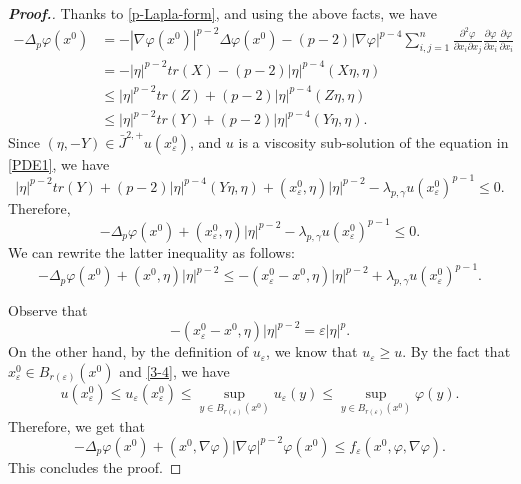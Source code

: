 \documentclass[12pt]{amsart}
\newcommand{\1}{\mathbf 1}
\begin{document}
\begin{proof}[\bf Proof.]
Thanks to \eqref{p-Lapla-form}, and using the above facts, we have
\begin{align*}
-\Delta_p \varphi (x^0) &=-|\nabla \varphi(x^0)|^{p-2} \Delta \varphi(x^0)-(p-2)|\nabla \varphi|^{p-4}\sum_{i,j=1}^n  \frac{\partial^2 \varphi}{\partial x_i \partial x_j}\frac{\partial \varphi}{\partial x_i} \frac{\partial \varphi}{\partial x_i}\\
&= -|\eta|^{p-2} tr(X)-(p-2)|\eta|^{p-4}(X\eta,\eta)\\
& \leq |\eta|^{p-2} tr(Z)+(p-2)|\eta|^{p-4}(Z\eta,\eta)\\
& \leq |\eta|^{p-2} tr(Y)+(p-2)|\eta|^{p-4}(Y\eta,\eta).
\end{align*}
Since $(\eta, -Y)\in \bar{J}^{2,+}u(x^0_\varepsilon)$, and $u$ is a viscosity sub-solution of the equation in \eqref{PDE1}, we have
\begin{equation}\nonumber
|\eta|^{p-2} tr(Y)+(p-2)|\eta|^{p-4}(Y\eta,\eta)+(x^0_\varepsilon,\eta)|\eta|^{p-2}-\lambda_{p,\gamma}u(x^0_\varepsilon)^{p-1}\leq 0.
\end{equation}
Therefore,
\begin{equation}\nonumber
-\Delta_p \varphi (x^0) +(x^0_\varepsilon,\eta)|\eta|^{p-2}-\lambda_{p,\gamma}u(x^0_\varepsilon)^{p-1} \leq 0.
\end{equation}
We can rewrite the latter inequality as follows:
\begin{equation}\nonumber
-\Delta_p \varphi (x^0)+(x^0,\eta)|\eta|^{p-2}  \leq -(x^0_\varepsilon-x^0,\eta)|\eta|^{p-2}+\lambda_{p,\gamma}u(x^0_\varepsilon)^{p-1}.
\end{equation}

Observe that
\[
 -(x^0_\varepsilon-x^0,\eta)|\eta|^{p-2}=\varepsilon |\eta|^p.
\]
On the other hand, by the definition of $u_\varepsilon$, we know that $u_\varepsilon \geq u$. By the fact that $x^0_\varepsilon\in B_{r(\varepsilon)}(x^0)$ and \eqref{3-4}, we have
\[
u(x^0_\varepsilon) \leq u_\varepsilon (x^0_\varepsilon)\leq {\sup}_{y\in B_{r(\varepsilon)}(x^0)} u_\varepsilon(y)\leq {\sup}_{y\in B_{r(\varepsilon)}(x^0)} \varphi(y).
\]
Therefore,
we get that
\[
-\Delta_p \varphi (x^0) +(x^0,\nabla \varphi)|\nabla \varphi|^{p-2} \varphi (x^0)\leq f_\varepsilon(x^0,\varphi,\nabla \varphi).
\]
This concludes the proof.
\end{proof}
\end{document}
